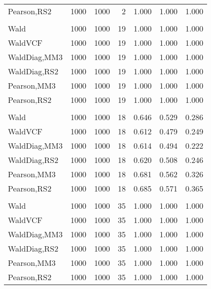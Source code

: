\documentclass[
]{article}
\begin{document}
\begin{table}[H]
{\begin{tabular}[t]{lrrrrrr}
\hspace{1em}Pearson,RS2 & 1000 & 1000 & 2 & 1.000 & 1.000 & 1.000\\
\addlinespace[0.3em]
\multicolumn{7}{l}{\textbf{1F 15V}}\\
\hspace{1em}Wald & 1000 & 1000 & 19 & 1.000 & 1.000 & 1.000\\
\hspace{1em}WaldVCF & 1000 & 1000 & 19 & 1.000 & 1.000 & 1.000\\
\hspace{1em}WaldDiag,MM3 & 1000 & 1000 & 19 & 1.000 & 1.000 & 1.000\\
\hspace{1em}WaldDiag,RS2 & 1000 & 1000 & 19 & 1.000 & 1.000 & 1.000\\
\hspace{1em}Pearson,MM3 & 1000 & 1000 & 19 & 1.000 & 1.000 & 1.000\\
\hspace{1em}Pearson,RS2 & 1000 & 1000 & 19 & 1.000 & 1.000 & 1.000\\
\addlinespace[0.3em]
\multicolumn{7}{l}{\textbf{2F 10V}}\\
\hspace{1em}Wald & 1000 & 1000 & 18 & 0.646 & 0.529 & 0.286\\
\hspace{1em}WaldVCF & 1000 & 1000 & 18 & 0.612 & 0.479 & 0.249\\
\hspace{1em}WaldDiag,MM3 & 1000 & 1000 & 18 & 0.614 & 0.494 & 0.222\\
\hspace{1em}WaldDiag,RS2 & 1000 & 1000 & 18 & 0.620 & 0.508 & 0.246\\
\hspace{1em}Pearson,MM3 & 1000 & 1000 & 18 & 0.681 & 0.562 & 0.326\\
\hspace{1em}Pearson,RS2 & 1000 & 1000 & 18 & 0.685 & 0.571 & 0.365\\
\addlinespace[0.3em]
\multicolumn{7}{l}{\textbf{3F 15V}}\\
\hspace{1em}Wald & 1000 & 1000 & 35 & 1.000 & 1.000 & 1.000\\
\hspace{1em}WaldVCF & 1000 & 1000 & 35 & 1.000 & 1.000 & 1.000\\
\hspace{1em}WaldDiag,MM3 & 1000 & 1000 & 35 & 1.000 & 1.000 & 1.000\\
\hspace{1em}WaldDiag,RS2 & 1000 & 1000 & 35 & 1.000 & 1.000 & 1.000\\
\hspace{1em}Pearson,MM3 & 1000 & 1000 & 35 & 1.000 & 1.000 & 1.000\\
\hspace{1em}Pearson,RS2 & 1000 & 1000 & 35 & 1.000 & 1.000 & 1.000\\
\bottomrule
\end{tabular}}
\endgroup{}
\end{table}
\end{document}
